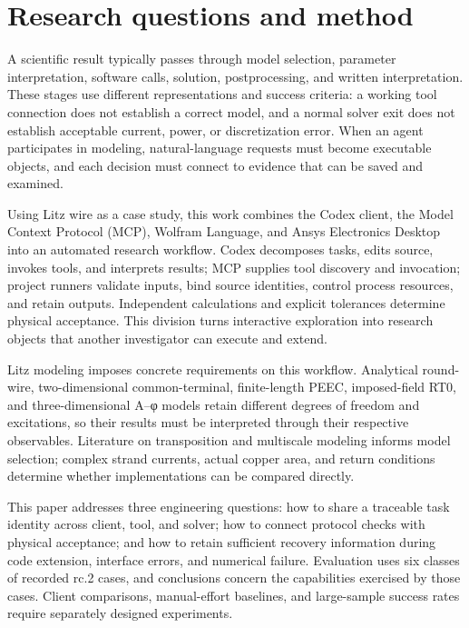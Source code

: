 \section{Research questions and method}
\label{chapter:01}

\hypertarget{auto.01.p1}{}
A scientific result typically passes through model selection, parameter interpretation, software calls, solution, postprocessing, and written interpretation. These stages use different representations and success criteria: a working tool connection does not establish a correct model, and a normal solver exit does not establish acceptable current, power, or discretization error. When an agent participates in modeling, natural-language requests must become executable objects, and each decision must connect to evidence that can be saved and examined.

\hypertarget{auto.01.p2}{}
Using Litz wire as a case study, this work combines the Codex client, the Model Context Protocol (MCP), Wolfram Language, and Ansys Electronics Desktop into an automated research workflow. Codex decomposes tasks, edits source, invokes tools, and interprets results; MCP supplies tool discovery and invocation; project runners validate inputs, bind source identities, control process resources, and retain outputs. Independent calculations and explicit tolerances determine physical acceptance. This division turns interactive exploration into research objects that another investigator can execute and extend. \cite{CODEX,MCP,WOLFRAM,AEDT}

\hypertarget{auto.01.p3}{}
Litz modeling imposes concrete requirements on this workflow. Analytical round-wire, two-dimensional common-terminal, finite-length PEEC, imposed-field RT0, and three-dimensional A–φ models retain different degrees of freedom and excitations, so their results must be interpreted through their respective observables. Literature on transposition and multiscale modeling informs model selection; complex strand currents, actual copper area, and return conditions determine whether implementations can be compared directly. \cite{P01,N01,RUEHLI1974,RT1977}

\hypertarget{auto.01.p4}{}
This paper addresses three engineering questions: how to share a traceable task identity across client, tool, and solver; how to connect protocol checks with physical acceptance; and how to retain sufficient recovery information during code extension, interface errors, and numerical failure. Evaluation uses six classes of recorded rc.2 cases, and conclusions concern the capabilities exercised by those cases. Client comparisons, manual-effort baselines, and large-sample success rates require separately designed experiments.

